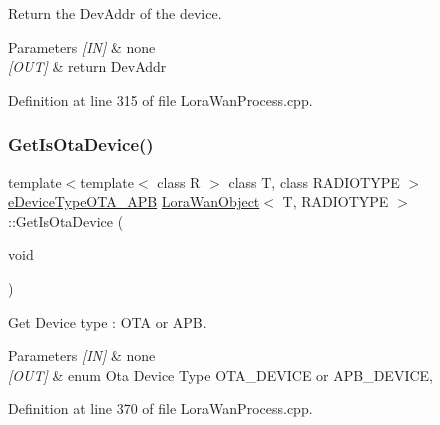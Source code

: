 Return the Dev\+Addr of the device. 


\begin{DoxyParams}{Parameters}
{\em \mbox{[}\+I\+N\mbox{]}} & none \\
\hline
{\em \mbox{[}\+O\+U\+T\mbox{]}} & return Dev\+Addr \\
\hline
\end{DoxyParams}


Definition at line 315 of file Lora\+Wan\+Process.\+cpp.

\mbox{\label{class_lora_wan_object_a15850f3c7c700edaed5f780d34bff4a8}} 
\subsubsection{\texorpdfstring{Get\+Is\+Ota\+Device()}{GetIsOtaDevice()}}
{\footnotesize\ttfamily template$<$template$<$ class R $>$ class T, class R\+A\+D\+I\+O\+T\+Y\+PE $>$ \\
\mbox{\hyperlink{_define_8h_a1e0a07faefc3dd68bbdd06f7c856cc74}{e\+Device\+Type\+O\+T\+A\+\_\+\+A\+PB}} \mbox{\hyperlink{class_lora_wan_object}{Lora\+Wan\+Object}}$<$ T, R\+A\+D\+I\+O\+T\+Y\+PE $>$\+::Get\+Is\+Ota\+Device (\begin{DoxyParamCaption}\item[{void}]{ }\end{DoxyParamCaption})}



Get Device type \+: O\+TA or A\+PB. 


\begin{DoxyParams}{Parameters}
{\em \mbox{[}\+I\+N\mbox{]}} & none \\
\hline
{\em \mbox{[}\+O\+U\+T\mbox{]}} & enum Ota Device Type O\+T\+A\+\_\+\+D\+E\+V\+I\+CE or A\+P\+B\+\_\+\+D\+E\+V\+I\+CE, \\
\hline
\end{DoxyParams}


Definition at line 370 of file Lora\+Wan\+Process.\+cpp.

\mbox{\label{class_lora_wan_object_add21dc9bc142938b0b37f958f6874100}} 
